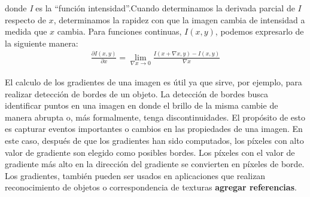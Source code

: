 	donde \textit{I} es la ``función intensidad''.Cuando determinamos la derivada parcial de $I$ respecto de $x$, determinamos la rapidez con que la imagen cambia de intensidad a medida que $x$ cambia. Para funciones continuas, $I(x,y)$, podemos expresarlo de la siguiente manera:
	\begin{align}
		\frac{\partial I(x,y)}{\partial x} = \lim_{\nabla x\rightarrow 0} \frac{I(x + \nabla x, y) - I(x,y)}{\nabla x}	
	\end{align}
	
	 El calculo de los gradientes de una imagen es útil ya que sirve, por ejemplo, para realizar detección de bordes de un objeto. La detección de bordes busca identificar puntos en una imagen en donde el brillo de la misma cambie de manera abrupta o, más formalmente, tenga discontinuidades. El propósito de esto es capturar eventos importantes o cambios en las propiedades de una imagen. En este caso, después de que los gradientes han sido computados, los píxeles con alto valor de gradiente son elegido como posibles bordes. Los píxeles con el valor de gradiente más alto en la dirección del gradiente se convierten en píxeles de borde. Los gradientes, también pueden ser usados en aplicaciones que realizan reconocimiento de objetos o correspondencia de texturas \textbf{agregar referencias}.


